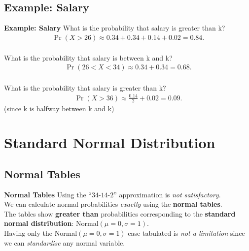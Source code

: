 \documentclass[compress]{beamer}        %
\makeatletter
\newcommand{\tcb}{\textcolor{beamer@blendedblue}}
\makeatother
\begin{document}
\subsection{Example: Salary}
\begin{frame}{\bf \tcb{Example: Salary}}
What is the probability that salary is greater than k?
\begin{align*}
\Pr(X > 26) \approx 0.34 + 0.34 + 0.14 + 0.02 = 0.84.\\
\end{align*}


What is the probability that salary is between k and k?
\begin{align*}
\Pr(26 < X < 34) \approx 0.34 + 0.34 = 0.68.\\
\end{align*}

What is the probability that salary is greater than k?
\begin{align*}
\Pr(X > 36) \approx \frac{0.14}{2} + 0.02 = 0.09.
\end{align*}
{\footnotesize(since k is halfway between k and k)}


\end{frame}






\section{Standard Normal Distribution}
\subsection{Normal Tables}
\begin{frame}{\bf \tcb{Normal Tables}}
Using the ``$34$-$14$-$2$'' approximation is \emph{not satisfactory}.\\[0.9cm]

We can calculate normal probabilities \emph{exactly} using the {\bf normal tables}.\\[0.9cm]

The tables show {\bf greater than} probabilities corresponding to the {\bf standard normal distribution}: Normal$(\mu=0,\sigma=1)$.\\[0.9cm]

Having only the Normal$(\mu=0,\sigma=1)$ case tabulated is \emph{not a limitation} since we can \emph{standardise} any normal variable.

\end{frame}
\end{document}
